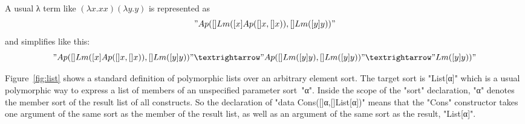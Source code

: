 \documentclass[letterpaper,11pt]{article}
\begin{document}
\begin{example}
\begin{itemize}
  \end{itemize}
  A usual λ term like $(λx.x x)(λy.y)$ is represented as
  \begin{displaymath}
    "Ap([]Lm([x]Ap([]x, []x)), []Lm([y]y))"    
  \end{displaymath}
  and simplifies like this:
  \begin{displaymath}
    "Ap([]Lm([x]Ap([]x, []x)), []Lm([y]y))" →
    "Ap([]Lm([y]y), []Lm([y]y))" →
    "Lm([y]y))"
  \end{displaymath}
\end{example}

\begin{example}[lists]\label{ex:list}
  Figure~\ref{fig:list} shows a standard definition of polymorphic lists over an arbitrary element
  sort.  The target sort is "List[α]" which is a usual polymorphic way to express a list of members
  of an unspecified parameter sort~"α".  Inside the scope of the "sort" declaration, "α" denotes the
  member sort of the result list of all constructs. So the declaration of "data Cons([]α,[]List[α])"
  means that the "Cons" constructor takes one argument of the same sort as the member of the result
  list, as well as an argument of the same sort as the result, "List[α]".

\end{example}
\end{document}
